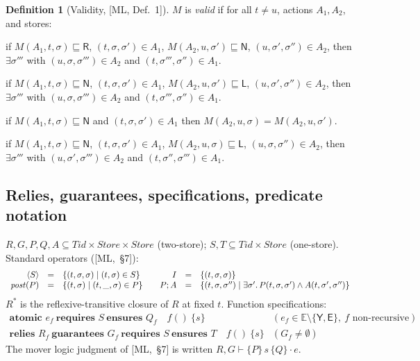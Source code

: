 \documentclass[11pt]{article}
\theoremstyle{plain}
\theoremstyle{plain}
\theoremstyle{definition}
\newtheorem{definition}{Definition}
\newcommand{\Tid}{\mathit{Tid}}
\newcommand{\Store}{\mathit{Store}}
\newcommand{\Effect}{\mathbb{E}}
\newcommand{\MY}{\mathsf{Y}}
\newcommand{\MR}{\mathsf{R}}
\newcommand{\ML}{\mathsf{L}}
\newcommand{\MN}{\mathsf{N}}
\newcommand{\ME}{\mathsf{E}}
\newcommand{\sq}{\sqsubseteq}
\newcommand{\one}[1]{\langle #1\rangle}
\newcommand{\postp}{\mathit{post}}
\newcommand{\mljud}[6]{#1,#2\vdash\{#3\}\,#4\,\{#5\}\cdot #6}
\begin{document}
\begin{definition}[Validity, {[ML, Def.~1]}]\label{def:valid}
$M$ is \emph{valid} if for all $t\neq u$, actions $A_1,A_2$, and stores:
\begin{description}[leftmargin=3.2em,style=nextline,itemsep=2pt]
\item[(V1)] if $M(A_1,t,\sigma)\sq\MR$, $(t,\sigma,\sigma')\in A_1$,
  $M(A_2,u,\sigma')\sq\MN$, $(u,\sigma',\sigma'')\in A_2$, then $\exists\sigma'''$
  with $(u,\sigma,\sigma''')\in A_2$ and $(t,\sigma''',\sigma'')\in A_1$.
\item[(V2)] if $M(A_1,t,\sigma)\sq\MN$, $(t,\sigma,\sigma')\in A_1$,
  $M(A_2,u,\sigma')\sq\ML$, $(u,\sigma',\sigma'')\in A_2$, then $\exists\sigma'''$
  with $(u,\sigma,\sigma''')\in A_2$ and $(t,\sigma''',\sigma'')\in A_1$.
\item[(V3)] if $M(A_1,t,\sigma)\sq\MN$ and $(t,\sigma,\sigma')\in A_1$ then
  $M(A_2,u,\sigma) = M(A_2,u,\sigma')$.
\item[(V4)] if $M(A_1,t,\sigma)\sq\MN$, $(t,\sigma,\sigma')\in A_1$,
  $M(A_2,u,\sigma)\sq\ML$, $(u,\sigma,\sigma'')\in A_2$, then $\exists\sigma'''$
  with $(u,\sigma',\sigma''')\in A_2$ and $(t,\sigma'',\sigma''')\in A_1$.
\end{description}
\end{definition}

\subsection{Relies, guarantees, specifications, predicate notation}

$R,G,P,Q,A \subseteq \Tid\times\Store\times\Store$ (two-store);
$S,T\subseteq\Tid\times\Store$ (one-store). Standard operators ([ML,~\S7]):
\[
\begin{array}{rcl@{\qquad}rcl}
\one{S} &=& \{(t,\sigma,\sigma)\mid (t,\sigma)\in S\} &
I &=& \{(t,\sigma,\sigma)\}\\
\postp(P) &=& \{(t,\sigma)\mid (t,\_,\sigma)\in P\} &
P;A &=& \{(t,\sigma,\sigma'')\mid \exists\sigma'.\,P(t,\sigma,\sigma')\wedge A(t,\sigma',\sigma'')\}
\end{array}
\]
$R^*$ is the reflexive-transitive closure of $R$ at fixed $t$. Function
specifications:
\[
\begin{array}{ll}
\textbf{atomic } e_f\ \textbf{requires } S\ \textbf{ensures } Q_f\quad f()\ \{s\}
& (e_f\in\Effect\setminus\{\MY,\ME\},\ \text{$f$ non-recursive})\\[2pt]
\textbf{relies } R_f\ \textbf{guarantees } G_f\ \textbf{requires } S\ \textbf{ensures } T\quad f()\ \{s\}
& (G_f \neq \emptyset)
\end{array}
\]
The mover logic judgment of [ML,~\S7] is written $\mljud{R}{G}{P}{s}{Q}{e}$.
\end{document}
